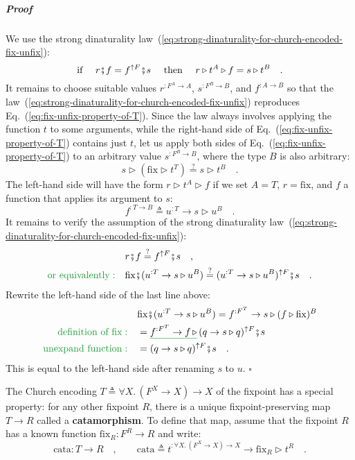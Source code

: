 \subparagraph{Proof}

We use the strong dinaturality law~(\ref{eq:strong-dinaturality-for-church-encoded-fix-unfix}):
\[
\text{if }\quad r\bef f=f^{\uparrow F}\bef s\quad\text{ then }\quad r\triangleright t^{A}\triangleright f=s\triangleright t^{B}\quad.
\]
It remains to choose suitable values $r^{:F^{A}\rightarrow A}$, $s^{:F^{B}\rightarrow B}$,
and $f^{:A\rightarrow B}$ so that the law~(\ref{eq:strong-dinaturality-for-church-encoded-fix-unfix})
reproduces Eq.~(\ref{eq:fix-unfix-property-of-T}). Since the law
always involves applying the function $t$ to some arguments, while
the right-hand side of Eq.~(\ref{eq:fix-unfix-property-of-T}) contains
just $t$, let us apply both sides of Eq.~(\ref{eq:fix-unfix-property-of-T})
to an arbitrary value $s^{:F^{B}\rightarrow B}$, where the type $B$
is also arbitrary:
\[
s\triangleright(\text{fix}\triangleright t^{T})\overset{?}{=}s\triangleright t^{B}\quad.
\]
The left-hand side will have the form $r\triangleright t^{A}\triangleright f$
if we set $A=T$, $r=\text{fix}$, and $f$ a function that applies
its argument to $s$:
\[
f^{:T\rightarrow B}\triangleq u^{:T}\rightarrow s\triangleright u^{B}\quad.
\]
It remains to verify the assumption of the strong dinaturality law~(\ref{eq:strong-dinaturality-for-church-encoded-fix-unfix}):
\begin{align*}
 & r\bef f\overset{?}{=}f^{\uparrow F}\bef s\quad,\\
{\color{greenunder}\text{or equivalently}:}\quad & \text{fix}\bef(u^{:T}\rightarrow s\triangleright u^{B})\overset{?}{=}(u^{:T}\rightarrow s\triangleright u^{B})^{\uparrow F}\bef s\quad.
\end{align*}
Rewrite the left-hand side of the last line above:
\begin{align*}
 & \text{fix}\bef(u^{:T}\rightarrow s\triangleright u^{B})=f^{:F^{T}}\rightarrow s\triangleright(f\triangleright\text{fix})^{B}\\
{\color{greenunder}\text{definition of }\text{fix}:}\quad & =\gunderline{f^{:F^{T}}\rightarrow f\,\triangleright}\,(q\rightarrow s\triangleright q)^{\uparrow F}\bef s\\
{\color{greenunder}\text{unexpand function}:}\quad & =(q\rightarrow s\triangleright q)^{\uparrow F}\bef s\quad.
\end{align*}
This is equal to the left-hand side after renaming $s$ to $u$. $\square$

The Church encoding $T\triangleq\forall X.\,(F^{X}\rightarrow X)\rightarrow X$
of the fixpoint has a special property: for any other fixpoint $R$,
there is a unique fixpoint-preserving map $T\rightarrow R$ called
a \textbf{catamorphism}. To define that map,
assume that the fixpoint $R$ has a known function $\text{fix}_{R}:F^{R}\rightarrow R$
and write:
\[
\text{cata}:T\rightarrow R\quad,\quad\quad\text{cata}\triangleq t^{:\forall X.\,(F^{X}\rightarrow X)\rightarrow X}\rightarrow\text{fix}_{R}\triangleright t^{R}\quad.
\]



